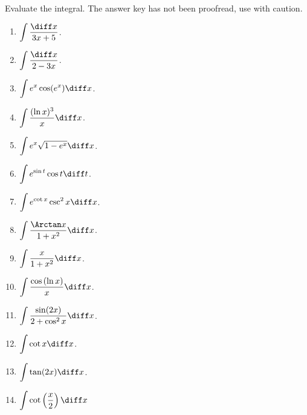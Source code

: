 Evaluate the integral. The answer key has not been proofread, use with caution.
\begin{multicols}{3}
\begin{enumerate}
\item $\displaystyle\int \frac{\diff x}{3x+5} $.


\item $\displaystyle\int \frac{\diff x}{2-3x}$.

\item $\displaystyle\int e^x\cos (e^x) \diff x$.

\item $\displaystyle\int \frac{(\ln x)^3}{x} \diff x$.

\item $\displaystyle\int e^x\sqrt{1-e^x} \diff x$.

\item $\displaystyle\int e^{\sin t }\cos t \diff t$.

\item $\displaystyle\int e^{\cot x}\csc^2x \diff x$.

\item \label{problemIntArctan(x)/(1+x^2)dx} $\displaystyle\int \frac{\Arctan x}{1+x^2} \diff x$. 

\item $\displaystyle\int \frac{x}{1+x^2} \diff x$. 

\item $\displaystyle\int \frac{\cos \left(\ln x\right)}{x} \diff x$.

\item \label{problemintsin(2x)/(2+cos^2x)dx} $\displaystyle\int \frac{\sin (2x)}{2+\cos^2x}\diff x$.

\item $\displaystyle\int \cot x \diff x$.


\item $\displaystyle\int \tan (2x) \diff x$.

\item $\displaystyle \int \cot \left(\frac{x}{2}\right) \diff x$

\end{enumerate}
\end{multicols}